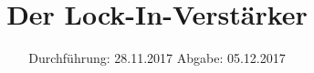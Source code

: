 
\usepackage{wrapfig}
\subject{VERSUCH 351}
\title{Der Lock-In-Verstärker}
\date{%
  \hspace{-2.5em}
  Durchführung: 28.11.2017
  \hspace{4em}
  Abgabe: 05.12.2017
}


  \setlength{\parindent}{0em}
  \maketitle
  \thispagestyle{empty}
  \newpage
  \tableofcontents
  \newpage





\newpage
\printbibliography{}


